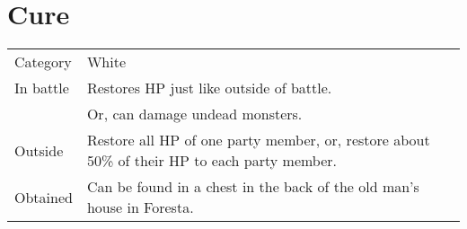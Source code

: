 \section{Cure}
\label{spell:cure}


\noindent\begin{tabularx}{\textwidth}[l]{lX}
	Category
	& White
\\ %
	In battle
	& Restores HP just like outside of battle. \\ 
	& Or, can damage undead monsters.
\\ %
	Outside
	& Restore all HP of one party member, or, restore about 50\% of their HP to each party member.
\\ %
	Obtained
	& Can be found in a chest in the back of the old man’s house in Foresta.
\end{tabularx}
